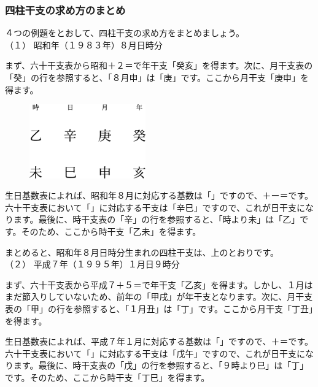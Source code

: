 \documentclass[a5paper,11pt,dvipdfmx]{tarticle}
\begin{document}
\subsubsection*{四柱干支の求め方のまとめ}
４つの例題をとおして、四柱干支の求め方をまとめましょう。\\

\noindent
（１） 昭和年（１９８３年）８月日時分

まず、六十干支表から昭和＋２＝で年干支「癸亥」を得ます。次に、月干支表の「癸」の行を参照すると、「８月申」は「庚」です。ここから月干支「庚申」を得ます。

\begin{figure}
  \includegraphics[width=50mm,angle=90]{figs/figure3-4.eps}
\end{figure}

生日基数表によれば、昭和年８月に対応する基数は「」ですので、＋ー＝です。六十干支表において「」に対応する干支は「辛巳」ですので、これが日干支になります。最後に、時干支表の「辛」の行を参照すると、「時より未」は「乙」です。そのため、ここから時干支「乙未」を得ます。

まとめると、昭和年８月日時分生まれの四柱干支は、上のとおりです。\\


\noindent
（２） 平成７年（１９９５年）１月日９時分

まず、六十干支表から平成７＋５＝で年干支「乙亥」を得ます。しかし、１月はまだ節入りしていないため、前年の「甲戌」が年干支となります。次に、月干支表の「甲」の行を参照すると、「１月丑」は「丁」です。ここから月干支「丁丑」を得ます。

生日基数表によれば、平成７年１月に対応する基数は「」ですので、＋＝です。六十干支表において「」に対応する干支は「戊午」ですので、これが日干支になります。最後に、時干支表の「戊」の行を参照すると、「９時より巳」は「丁」です。そのため、ここから時干支「丁巳」を得ます。
\end{document}
